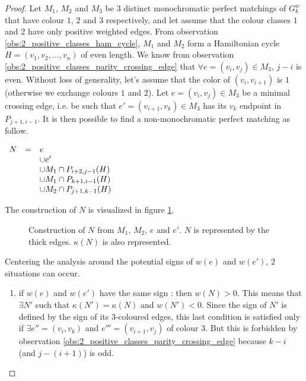 \begin{proof}
    Let $M_1$, $M_2$ and $M_3$ be 3 distinct monochromatic perfect matchings of $G_k^w$ that have colour $1$, $2$ and $3$ respectively, and let assume that the colour classes $1$ and $2$ have only positive weighted edges. From observation \ref{obs:2_positive_classes_ham_cycle}, $M_1$ and $M_2$ form a Hamiltonian cycle $H = (v_1, v_2, \dots, v_n)$ of even length. We know from observation \ref{obs:2_positive_classes_parity_crossing_edge} that $\forall e = (v_i, v_j) \in M_3$, $j-i$ is even. Without loss of generality, let's assume that the color of $(v_i, v_{i + 1})$ is $1$ (otherwise we exchange colours $1$ and $2$). Let $e = (v_i, v_j) \in M_3$ be a minimal crossing edge, i.e. be such that $e' = (v_{i+1}, v_k) \in M_3$ has its $v_k$ endpoint in $P_{j+1, i-1}$. It is then possible to find a non-monochromatic perfect matching as follow.

    \begin{center}
        $\begin{array}{r c l}
             N & = & e                             \\
             &   & \cup e'                       \\
             &   & \cup M_1 \cap P_{i+2, j-1}(H) \\
             &   & \cup M_1 \cap P_{k+1, i-1}(H) \\
             &   & \cup M_2 \cap P_{j+1, k-1}(H)
        \end{array}$
    \end{center}

    The construction of $N$ is visualized in figure \ref{fig:2_pos_classes_proof}.

    \begin{figure}[H]
        \caption{Construction of $N$ from $M_1$, $M_2$, $e$ and $e'$. $N$ is represented by the thick edges. $\kappa(N)$ is also represented.}
        \label{fig:2_pos_classes_proof}
    \end{figure}

    Centering the analysis around the potential signs of $w(e)$ and $w(e')$, $2$ situations can occur.

    \begin{enumerate}
        \item if $w(e)$ and $w(e')$ have the same sign : then $w(N) > 0$. This means that $\exists N'$ such that $\kappa(N') = \kappa(N)$ and $w(N') < 0$. Since the sign of $N'$ is defined by the sign of its $3$-coloured edges, this last condition is satisfied only if $\exists e'' = (v_i, v_k)$ and $e''' = (v_{i+1}, v_j)$ of colour $3$. But this is forbidden by observation \ref{obs:2_positive_classes_parity_crossing_edge} because $k - i$ (and $j - (i + 1)$) is odd.


\end{enumerate}
\end{proof}
